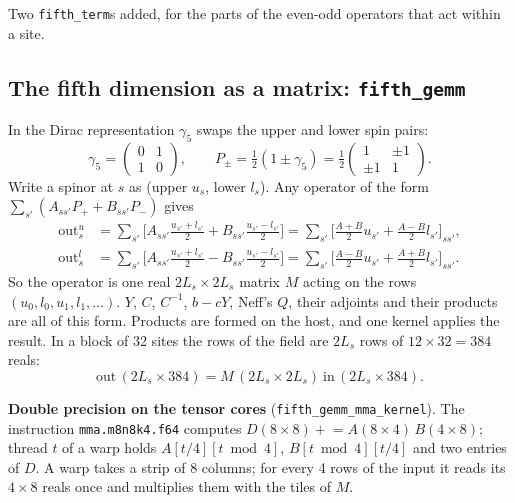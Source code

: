 \documentclass[11pt,a4paper]{article}
\numberwithin{equation}{section}
\newcommand{\code}[1]{\texttt{\small #1}}
\begin{document}
Two \code{fifth\_term}s added, for the parts of the even-odd operators that act within a site.

\subsection{The fifth dimension as a matrix: \code{fifth\_gemm}}

In the Dirac representation $\gamma_5$ swaps the upper and lower spin pairs:
\begin{equation}
\gamma_5=\begin{pmatrix}0&1\\1&0\end{pmatrix},\qquad
P_\pm = \tfrac12(1\pm\gamma_5) = \tfrac12\begin{pmatrix}1&\pm1\\\pm1&1\end{pmatrix}.
\end{equation}
Write a spinor at $s$ as (upper $u_s$, lower $l_s$). Any operator of the form
$\sum_{s'}(A_{ss'}P_+ + B_{ss'}P_-)$ gives
\begin{align}
\text{out}^u_s &= \sum_{s'}\Big[A_{ss'}\tfrac{u_{s'}+l_{s'}}{2} + B_{ss'}\tfrac{u_{s'}-l_{s'}}{2}\Big]
= \sum_{s'}\Big[\tfrac{A+B}{2}u_{s'} + \tfrac{A-B}{2}l_{s'}\Big]_{ss'},\\
\text{out}^l_s &= \sum_{s'}\Big[A_{ss'}\tfrac{u_{s'}+l_{s'}}{2} - B_{ss'}\tfrac{u_{s'}-l_{s'}}{2}\Big]
= \sum_{s'}\Big[\tfrac{A-B}{2}u_{s'} + \tfrac{A+B}{2}l_{s'}\Big]_{ss'}.
\end{align}
So the operator is one real $2L_s\times2L_s$ matrix $M$ acting on the rows $(u_0,l_0,u_1,l_1,\dots)$.
$Y$, $C$, $C^{-1}$, $b-cY$, Neff's $Q$, their adjoints and their products are all of this form.
Products are formed on the host, and one kernel applies the result. In a block of 32 sites the
rows of the field are $2L_s$ rows of $12\times32=384$ reals:
\begin{equation}
\text{out}\,(2L_s\times384) = M\,(2L_s\times2L_s)\ \text{in}\,(2L_s\times384).
\end{equation}

\textbf{Double precision on the tensor cores} (\code{fifth\_gemm\_mma\_kernel}). The instruction
\code{mma.m8n8k4.f64} computes $D(8\times8)\mathrel{+}=A(8\times4)\,B(4\times8)$; thread $t$ of a
warp holds $A[t/4][t\bmod4]$, $B[t\bmod4][t/4]$ and two entries of $D$. A warp takes a strip of 8
columns; for every 4 rows of the input it reads its $4\times8$ reals once and multiplies them
with the tiles of $M$.
\end{document}
